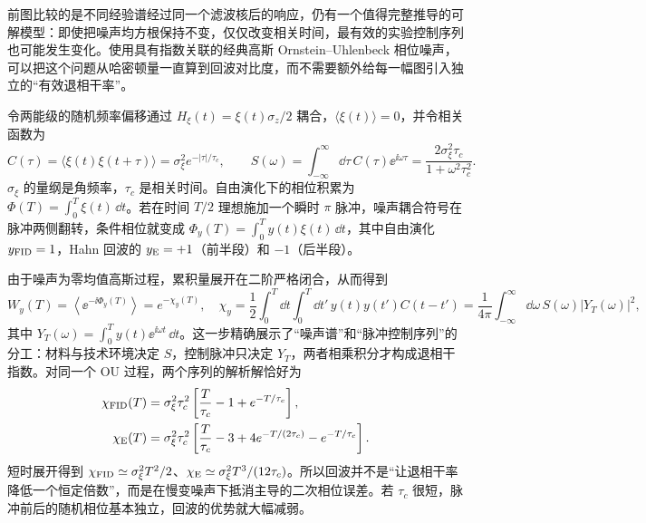 \medskip

前图比较的是不同经验谱经过同一个滤波核后的响应，仍有一个值得完整推导的可解模型：即使把噪声均方根保持不变，仅仅改变相关时间，最有效的实验控制序列也可能发生变化。使用具有指数关联的经典高斯 Ornstein--Uhlenbeck 相位噪声，可以把这个问题从哈密顿量一直算到回波对比度，而不需要额外给每一幅图引入独立的“有效退相干率”。

令两能级的随机频率偏移通过 $H_\xi(t)=\xi(t)\sigma_z/2$ 耦合，$\langle\xi(t)\rangle=0$，并令相关函数为
\begin{equation}
C(\tau)=\langle\xi(t)\xi(t+\tau)\rangle
=\sigma_\xi^2e^{-|\tau|/\tau_c},\qquad
S(\omega)=\int_{-\infty}^{\infty}\!\dd \tau\,C(\tau)\ee^{\ii\omega\tau}
=\frac{2\sigma_\xi^2\tau_c}{1+\omega^2\tau_c^2}.
\label{eq:ch05-ou-spectrum}
\end{equation}
$\sigma_\xi$ 的量纲是角频率，$\tau_c$ 是相关时间。自由演化下的相位积累为 $\Phi(T)=\int_0^T\xi(t)\,\dd t$。若在时间 $T/2$ 理想施加一个瞬时 $\pi$ 脉冲，噪声耦合符号在脉冲两侧翻转，条件相位就变成 $\Phi_y(T)=\int_0^T y(t)\xi(t)\,\dd t$，其中自由演化 $y_{\rm FID}=1$，Hahn 回波的 $y_{\rm E}=+1$（前半段）和 $-1$（后半段）。

由于噪声为零均值高斯过程，累积量展开在二阶严格闭合，从而得到
\begin{equation}
W_y(T)=\left\langle \ee^{-\ii\Phi_y(T)}\right\rangle
=e^{-\chi_y(T)},\quad
\chi_y=\frac12\int_0^T\!\dd t\int_0^T\!\dd t'\,
 y(t)y(t')C(t-t')
=\frac1{4\pi}\int_{-\infty}^{\infty}\!\dd \omega\,S(\omega)|Y_T(\omega)|^2,
\label{eq:ch05-filter-functional}
\end{equation}
其中 $Y_T(\omega)=\int_0^T y(t)\ee^{\ii\omega t}\,\dd t$。这一步精确展示了“噪声谱”和“脉冲控制序列”的分工：材料与技术环境决定 $S$，控制脉冲只决定 $Y_T$，两者相乘积分才构成退相干指数。对同一个 OU 过程，两个序列的解析解恰好为
\begin{equation}
\begin{aligned}
\chi_{\rm FID}(T)&=\sigma_\xi^2\tau_c^2\left[\frac{T}{\tau_c}-1+e^{-T/\tau_c}\right],\\
\chi_{\rm E}(T)&=\sigma_\xi^2\tau_c^2\left[\frac{T}{\tau_c}-3+4e^{-T/(2\tau_c)}-e^{-T/\tau_c}\right].
\end{aligned}
\label{eq:ch05-ou-exact}
\end{equation}
短时展开得到 $\chi_{\rm FID}\simeq\sigma_\xi^2T^2/2$、$\chi_{\rm E}\simeq\sigma_\xi^2T^3/(12\tau_c)$。所以回波并不是“让退相干率降低一个恒定倍数”，而是在慢变噪声下抵消主导的二次相位误差。若 $\tau_c$ 很短，脉冲前后的随机相位基本独立，回波的优势就大幅减弱。

